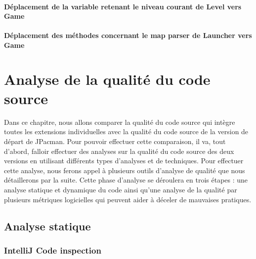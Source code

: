 \documentclass[12pt, openany]{report}
\begin{document}
\subsubsection{Déplacement de la variable retenant le niveau courant de \og Level \fg vers \og Game \fg}
\subsubsection{Déplacement des méthodes concernant le \og map parser \fg de \og Launcher \fg vers \og Game \fg}









\chapter{Analyse de la qualité du code source}

Dans ce chapitre, nous allons comparer la qualité du code source qui intègre toutes les extensions individuelles avec la qualité du code source de la version de départ de JPacman. Pour pouvoir effectuer cette comparaison, il va, tout d'abord, falloir effectuer des analyses sur la qualité du code source des deux versions en utilisant différents types d'analyses et de techniques. Pour effectuer cette analyse, nous ferons appel à plusieurs outils d'analyse de qualité que nous détaillerons par la suite. Cette phase d'analyse se déroulera en trois étapes : une analyse statique et dynamique du code ainsi qu'une analyse de la qualité par plusieurs métriques logicielles qui peuvent aider à déceler de mauvaises pratiques. 

\section{Analyse statique}
\subsection{IntelliJ Code inspection}
\end{document}
